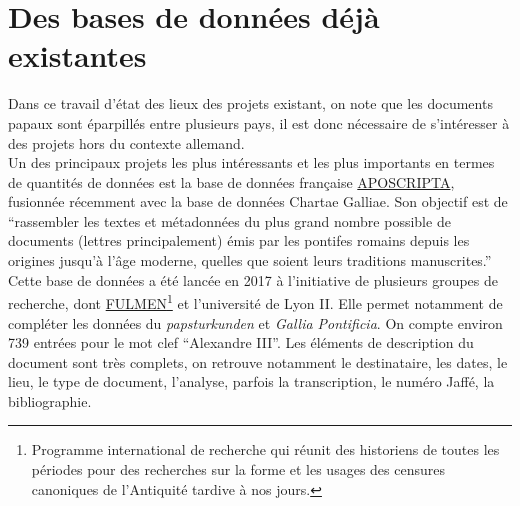     \section{Des bases de données déjà existantes}

Dans ce travail d’état des lieux des projets existant, on note que les documents papaux sont éparpillés entre plusieurs pays, il est donc nécessaire de s’intéresser à des projets hors du contexte allemand.\\ 
Un des principaux projets les plus intéressants et les plus importants en termes de quantités de données est la base de données française \href{http://telma-chartes.irht.cnrs.fr/}{APOSCRIPTA}, fusionnée récemment avec la base de données Chartae Galliae. Son objectif est de “rassembler les textes et métadonnées du plus grand nombre possible de documents (lettres principalement) émis par les pontifes romains depuis les origines jusqu'à l'âge moderne, quelles que soient leurs traditions manuscrites.” Cette base de données a été lancée en 2017 à l’initiative de plusieurs groupes de recherche, dont \href{https://fulmen.hypotheses.org/category/fulmen-un-programme-de-recherches-collectives}{FULMEN}\footnote{Programme international de recherche qui réunit des historiens de toutes les périodes pour des recherches sur la forme et les usages des censures canoniques de l’Antiquité tardive à nos jours.} et l’université de Lyon II. Elle permet notamment de compléter les données du \textit{papsturkunden} et \textit{Gallia Pontificia}. On compte environ 739 entrées pour le mot clef “Alexandre III”. Les éléments de description du document sont très complets, on retrouve notamment le destinataire, les dates, le lieu, le type de document, l’analyse, parfois la transcription, le numéro Jaffé, la bibliographie.\\

